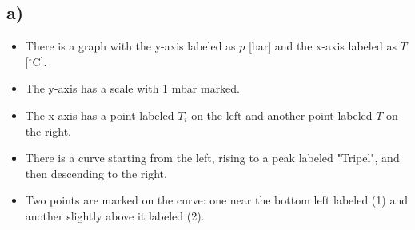 

\subsection*{a)}

\begin{itemize}
    \item There is a graph with the y-axis labeled as $p$ [bar] and the x-axis labeled as $T$ [$^\circ$C].
    \item The y-axis has a scale with 1 mbar marked.
    \item The x-axis has a point labeled $T_i$ on the left and another point labeled $T$ on the right.
    \item There is a curve starting from the left, rising to a peak labeled "Tripel", and then descending to the right.
    \item Two points are marked on the curve: one near the bottom left labeled (1) and another slightly above it labeled (2).
\end{itemize}